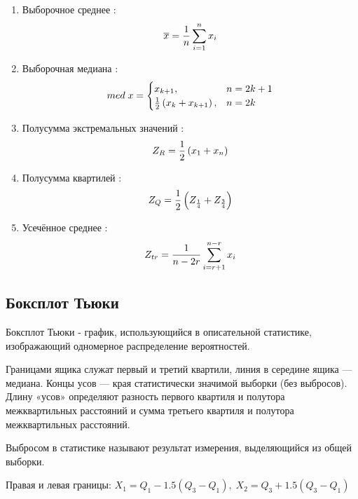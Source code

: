 \documentclass[a4]{article}
\begin{document}
\begin{enumerate}
\item Выборочное среднее :
\begin{equation}\label{eqn:average}
\overline{x} = \frac{1}{n}\sum_{i=1}^n x_i \hfill  
\end{equation}
\item Выборочная медиана :
\begin{equation}
med\; x = \begin{cases}
x_{k+1}, & n = 2k+1\\
\frac{1}{2}\left(x_k+x_{k+1}\right), & n = 2k
\end{cases} \hfill  \label{eqn:med}
\end{equation}
\item Полусумма экстремальных значений :
\begin{equation}
Z_R = \frac{1}{2}\left(x_1+x_n\right) \hfill  \label{eqn:mean_extr}
\end{equation}
\item Полусумма квартилей :
\begin{equation}
Z_Q = \frac{1}{2}\left(Z_{\frac{1}{4}}+Z_{\frac{3}{4}}\right) \hfill  \label{eqn:quartiles}
\end{equation}
\item Усечённое среднее :
\begin{equation}
Z_{tr} = \frac{1}{n - 2r}\sum_{i=r+1}^{n-r} x_i \hfill  \label{eqn:cut_mean}
\end{equation}
\end{enumerate}


\subsection{Боксплот Тьюки}

Боксплот Тьюки - график, использующийся в описательной статистике, изображающий одномерное распределение вероятностей.

Границами ящика служат первый и третий квартили, линия в середине
ящика — медиана. Концы усов — края статистически значимой выборки
(без выбросов). Длину «усов» определяют разность первого квартиля и полутора межквартильных расстояний и сумма третьего квартиля и полутора межквартильных расстояний. 

Выбросом в статистике называют результат измерения, выделяющийся из общей выборки.

Правая и левая границы:  $X_{1} = Q_{1} - 1.5(Q_{3} - Q_{1}),\;X_{2} = Q_{3} + 1.5(Q_{3} - Q_{1})$
\end{document}
